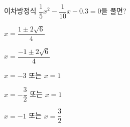 이차방정식 $\dfrac{1}{5}x^2-\dfrac{1}{10}x-0.3=0$을 풀면?
\begin{choicesii}{\rule[-3ex]{0pt}{8ex}$x=\dfrac{1\pm2\sqrt{6}}{4}$}{\rule[-3ex]{0pt}{8ex}$x=\dfrac{-1\pm2\sqrt{6}}{4}$}{\rule[-3ex]{0pt}{8ex}$x=-3$ 또는 $x=1$}{\rule[-3ex]{0pt}{8ex}$x=-\dfrac{3}{2}$ 또는 $x=1$}{\rule[-3ex]{0pt}{8ex}$x=-1$ 또는 $x=\dfrac{3}{2}$}\end{choicesii}
